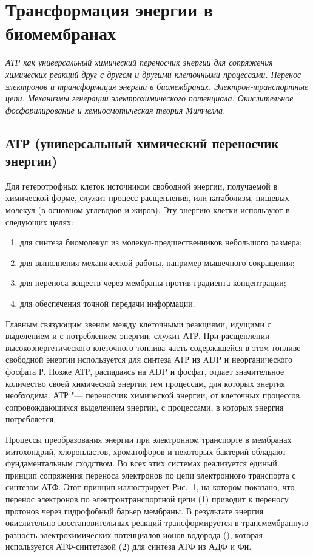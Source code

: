 \documentclass[12pt,a4paper,oneside]{book}
\begin{document}
\newpage
\section{Трансформация энергии в биомембранах}
{\it АТР как универсальный химический переносчик энергии для сопряжения химических реакций друг с другом и другими клеточными процессами. Перенос электронов и трансформация энергии в биомембранах. Электрон-транспортные цепи. Механизмы генерации электрохимического потенциала. Окислительное фосфорилирование и хемиосмотическая теория Митчелла.}

\subsection{АТР (универсальный химический переносчик энергии)}

Для гетеротрофных клеток источником свободной энергии, получаемой в химической форме, служит процесс расщепления, или катаболизм, пищевых молекул (в основном углеводов и жиров). Эту энергию клетки используют в следующих целях: 
\begin{enumerate}
\item для синтеза биомолекул из молекул-предшественников небольшого размера; 
\item для выполнения механической работы, например мышечного сокращения;
\item для переноса веществ через мембраны против градиента концентрации;
\item для обеспечения точной передачи информации.
\end{enumerate}

Главным связующим звеном между клеточными реакциями, идущими с выделением и с потреблением энергии, служит АТР. При расщеплении высокоэнергетического клеточного топлива часть содержащейся в этом топливе свободной энергии используется для синтеза АТР из ADP и неорганического фосфата Р. Позже АТР, распадаясь на ADP и фосфат, отдает значительное количество своей химической энергии тем процессам, для которых энергия необходима. АТР "--- переносчик химической энергии, от клеточных процессов, сопровождающихся выделением энергии, с процессами, в которых энергия потребляется.

Процессы преобразования энергии при электронном транспорте в мембранах митохондрий, хлоропластов, хроматофоров и некоторых бактерий обладают фундаментальным сходством. Во всех этих системах реализуется единый принцип сопряжения переноса электронов по цепи электронного транспорта с синтезом АТФ. Этот принцип иллюстрирует Рис.~1, на котором показано, что перенос электронов по электронтранспортной цепи (1) приводит к переносу протонов через гидрофобный барьер мембраны. В результате энергия окислительно-восстановительных реакций трансформируется в трансмембранную разность электрохимических потенциалов ионов водорода (), которая используется АТФ-синтетазой (2) для синтеза АТФ из АДФ и Фн.
\end{document}
